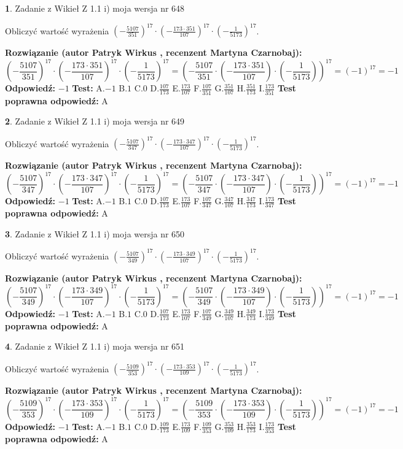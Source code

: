 \documentclass[12pt, a4paper]{article}
\theoremstyle{definition} %
\newtheorem{zad}{}
\newcommand{\zadStart}[1]{\begin{zad}#1\newline}
\newcommand{\zadStop}{\end{zad}}
\newcommand{\rozwStart}[2]{\noindent \textbf{Rozwiązanie (autor #1 , recenzent #2): }\newline}
\newcommand{\rozwStop}{\newline}
\newcommand{\odpStart}{\noindent \textbf{Odpowiedź:}\newline}
\newcommand{\odpStop}{\newline}
\newcommand{\testStart}{\noindent \textbf{Test:}\newline}
\newcommand{\testStop}{\newline}
\newcommand{\kluczStart}{\noindent \textbf{Test poprawna odpowiedź:}\newline}
\newcommand{\kluczStop}{\newline}
\begin{document}
\zadStart{Zadanie z Wikieł Z 1.1 i) moja wersja nr 648}

Obliczyć wartość wyrażenia $(-\frac{5107}{351})^{17} \cdot (-\frac{173 \cdot 351}{107})^{17} \cdot (-\frac{1}{5173})^{17}$.
\zadStop
\rozwStart{Patryk Wirkus}{Martyna Czarnobaj}
$$(-\frac{5107}{351})^{17} \cdot (-\frac{173 \cdot 351}{107})^{17} \cdot (-\frac{1}{5173})^{17} = (-\frac{5107}{351} \cdot (-\frac{173 \cdot 351}{107}) \cdot (-\frac{1}{5173}))^{17} = (-1)^{17} = -1$$
\rozwStop
\odpStart
$-1$
\odpStop
\testStart
A.$-1$ B.$1$ C.$0$ D.$\frac{107}{173}$ E.$\frac{173}{107}$
F.$\frac{107}{351}$ G.$\frac{351}{107}$
H.$\frac{351}{173}$
I.$\frac{173}{351}$
\testStop
\kluczStart
A
\kluczStop



\zadStart{Zadanie z Wikieł Z 1.1 i) moja wersja nr 649}

Obliczyć wartość wyrażenia $(-\frac{5107}{347})^{17} \cdot (-\frac{173 \cdot 347}{107})^{17} \cdot (-\frac{1}{5173})^{17}$.
\zadStop
\rozwStart{Patryk Wirkus}{Martyna Czarnobaj}
$$(-\frac{5107}{347})^{17} \cdot (-\frac{173 \cdot 347}{107})^{17} \cdot (-\frac{1}{5173})^{17} = (-\frac{5107}{347} \cdot (-\frac{173 \cdot 347}{107}) \cdot (-\frac{1}{5173}))^{17} = (-1)^{17} = -1$$
\rozwStop
\odpStart
$-1$
\odpStop
\testStart
A.$-1$ B.$1$ C.$0$ D.$\frac{107}{173}$ E.$\frac{173}{107}$
F.$\frac{107}{347}$ G.$\frac{347}{107}$
H.$\frac{347}{173}$
I.$\frac{173}{347}$
\testStop
\kluczStart
A
\kluczStop



\zadStart{Zadanie z Wikieł Z 1.1 i) moja wersja nr 650}

Obliczyć wartość wyrażenia $(-\frac{5107}{349})^{17} \cdot (-\frac{173 \cdot 349}{107})^{17} \cdot (-\frac{1}{5173})^{17}$.
\zadStop
\rozwStart{Patryk Wirkus}{Martyna Czarnobaj}
$$(-\frac{5107}{349})^{17} \cdot (-\frac{173 \cdot 349}{107})^{17} \cdot (-\frac{1}{5173})^{17} = (-\frac{5107}{349} \cdot (-\frac{173 \cdot 349}{107}) \cdot (-\frac{1}{5173}))^{17} = (-1)^{17} = -1$$
\rozwStop
\odpStart
$-1$
\odpStop
\testStart
A.$-1$ B.$1$ C.$0$ D.$\frac{107}{173}$ E.$\frac{173}{107}$
F.$\frac{107}{349}$ G.$\frac{349}{107}$
H.$\frac{349}{173}$
I.$\frac{173}{349}$
\testStop
\kluczStart
A
\kluczStop



\zadStart{Zadanie z Wikieł Z 1.1 i) moja wersja nr 651}

Obliczyć wartość wyrażenia $(-\frac{5109}{353})^{17} \cdot (-\frac{173 \cdot 353}{109})^{17} \cdot (-\frac{1}{5173})^{17}$.
\zadStop
\rozwStart{Patryk Wirkus}{Martyna Czarnobaj}
$$(-\frac{5109}{353})^{17} \cdot (-\frac{173 \cdot 353}{109})^{17} \cdot (-\frac{1}{5173})^{17} = (-\frac{5109}{353} \cdot (-\frac{173 \cdot 353}{109}) \cdot (-\frac{1}{5173}))^{17} = (-1)^{17} = -1$$
\rozwStop
\odpStart
$-1$
\odpStop
\testStart
A.$-1$ B.$1$ C.$0$ D.$\frac{109}{173}$ E.$\frac{173}{109}$
F.$\frac{109}{353}$ G.$\frac{353}{109}$
H.$\frac{353}{173}$
I.$\frac{173}{353}$
\testStop
\kluczStart
A
\kluczStop
\end{document}
